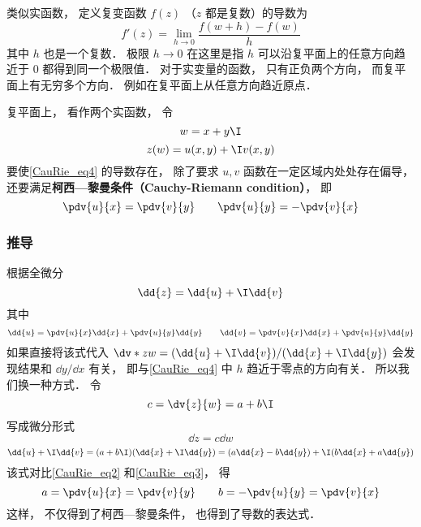 
\begin{issues}
\issueDraft
\end{issues}


类似实函数， 定义复变函数 $f(z)$ （$z$ 都是复数）的导数为
\begin{equation}\label{CauRie_eq4}
f'(z) = \lim_{h\to 0} \frac{f(w + h) - f(w)}{h}
\end{equation}
其中 $h$ 也是一个复数． 极限 $h \to 0$ 在这里是指 $h$ 可以沿复平面上的任意方向趋近于 $0$ 都得到同一个极限值． 对于实变量的函数， 只有正负两个方向， 而复平面上有无穷多个方向． 例如在复平面上从任意方向趋近原点．

复平面上， 看作两个实函数， 令
\begin{equation}
w = x + y\I
\end{equation}
\begin{equation}
z(w) = u(x, y) + \I v(x, y)
\end{equation}
要使\autoref{CauRie_eq4} 的导数存在， 除了要求 $u, v$ 函数在一定区域内处处存在偏导， 还要满足\textbf{柯西—黎曼条件（Cauchy-Riemann condition）}， 即
\begin{equation}\label{CauRie_eq1}
\pdv{u}{x} = \pdv{v}{y} \qquad
\pdv{u}{y} = - \pdv{v}{x}
\end{equation}

\subsubsection{推导}
根据全微分
\begin{equation}\label{CauRie_eq2}
\dd{z} = \dd{u} + \I \dd{v}
\end{equation}
其中
\begin{equation}\label{CauRie_eq3}
\dd{u} = \pdv{u}{x} \dd{x} + \pdv{u}{y} \dd{y} \qquad
\dd{v} = \pdv{v}{x} \dd{x} + \pdv{u}{y} \dd{y}
\end{equation}
如果直接将该式代入 $\dv*{z}{w} = (\dd{u} + \I \dd{v})/(\dd{x} + \I \dd{y})$ 会发现结果和 $\dd{y}/\dd{x}$ 有关， 即与\autoref{CauRie_eq4} 中 $h$ 趋近于零点的方向有关． 所以我们换一种方式． 令
\begin{equation}
c = \dv{z}{w} = a + b\I
\end{equation}
写成微分形式
\begin{equation}
\dd{z} = c\dd{w}
\end{equation}
\begin{equation}
\dd{u} + \I \dd{v} = (a + b\I)(\dd{x} + \I\dd{y}) = (a \dd{x} - b\dd{y}) + \I (b \dd{x} + a\dd{y})
\end{equation}
该式对比\autoref{CauRie_eq2} 和\autoref{CauRie_eq3}， 得
\begin{equation}
a = \pdv{u}{x} = \pdv{v}{y} \qquad
b = -\pdv{u}{y} = \pdv{v}{x}
\end{equation}
这样， 不仅得到了柯西—黎曼条件， 也得到了导数的表达式．

